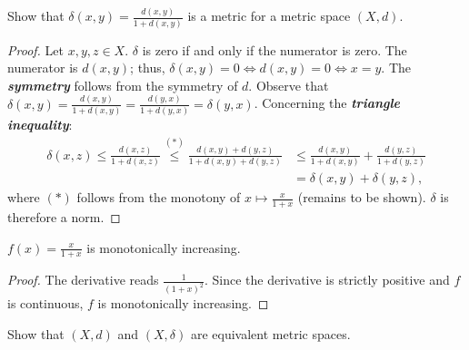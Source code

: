 \documentclass[a4paper]{article}
\renewcommand{\hline}{\noindent\makebox[\linewidth]{\rule{12cm}{1pt}}}
\newcommand{\vip}[1]{\textit{\textbf{#1}}}
\begin{document}
\hline


\begin{issue}{}{}
Show that $\delta(x,y) = \frac{d(x,y)}{1+d(x,y)}$ is a metric for a metric space $(X,d)$.
\end{issue}

\begin{proof}
Let $x,y,z \in X$. $\delta$ is zero if and only if the numerator is zero. The numerator is $d(x,y)$; thus, $\delta(x,y) = 0 \iff d(x,y) = 0 \iff x = y$. The \vip{symmetry} follows from the {symmetry} of $d$. Observe that $\delta(x,y) = \frac{d(x,y)}{1+d(x,y)} = \frac{d(y,x)}{1+d(y,x)} = \delta(y,x)$. Concerning the \vip{triangle inequality}: 
\begin{align*}
    \delta(x,z) \leq \frac{d(x,z)}{1+d(x,z)} \overset{(*)}{\leq} \frac{d(x,y) + d(y,z)}{1+d(x,y) + d(y,z)} &\leq \frac{d(x,y)}{1+d(x,y)} + \frac{d(y,z)}{1 + d(y,z)} \\
    &= \delta(x,y) + \delta(y,z),
\end{align*}
where $(*)$ follows from the monotony of $x \mapsto \frac{x}{1+x}$ (remains to be shown). $\delta$ is therefore a norm.
\end{proof}

\hline

\begin{lemma}{}{}
$f(x) = \frac{x}{1+x}$ is monotonically increasing.
\end{lemma}

\begin{proof}
The derivative reads $\frac{1}{(1+x)^2}$. Since the derivative is strictly positive and $f$ is continuous, $f$ is monotonically increasing.
\end{proof}

\hline

\begin{issue}{}{}
Show that $(X,d)$ and $(X,\delta)$ are equivalent metric spaces.
\end{issue}
\end{document}
